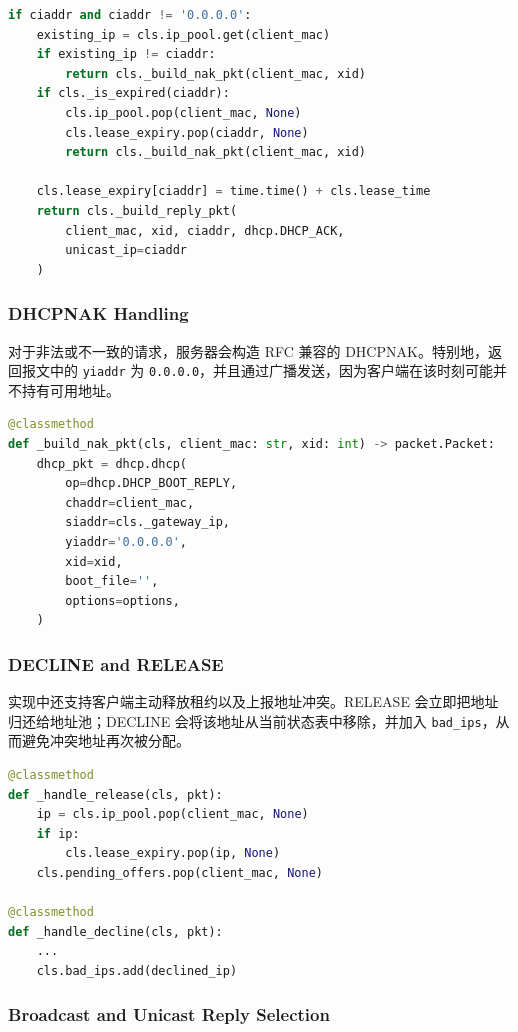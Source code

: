 \documentclass[11pt,a4paper]{ctexart}
\begin{document}
\begin{lstlisting}[language=Python]
if ciaddr and ciaddr != '0.0.0.0':
    existing_ip = cls.ip_pool.get(client_mac)
    if existing_ip != ciaddr:
        return cls._build_nak_pkt(client_mac, xid)
    if cls._is_expired(ciaddr):
        cls.ip_pool.pop(client_mac, None)
        cls.lease_expiry.pop(ciaddr, None)
        return cls._build_nak_pkt(client_mac, xid)

    cls.lease_expiry[ciaddr] = time.time() + cls.lease_time
    return cls._build_reply_pkt(
        client_mac, xid, ciaddr, dhcp.DHCP_ACK,
        unicast_ip=ciaddr
    )
\end{lstlisting}

\subsubsection{DHCPNAK Handling}

对于非法或不一致的请求，服务器会构造 RFC 兼容的 DHCPNAK。特别地，返回报文中的 \texttt{yiaddr} 为 \texttt{0.0.0.0}，并且通过广播发送，因为客户端在该时刻可能并不持有可用地址。

\begin{lstlisting}[language=Python]
@classmethod
def _build_nak_pkt(cls, client_mac: str, xid: int) -> packet.Packet:
    dhcp_pkt = dhcp.dhcp(
        op=dhcp.DHCP_BOOT_REPLY,
        chaddr=client_mac,
        siaddr=cls._gateway_ip,
        yiaddr='0.0.0.0',
        xid=xid,
        boot_file='',
        options=options,
    )
\end{lstlisting}

\subsubsection{DECLINE and RELEASE}

实现中还支持客户端主动释放租约以及上报地址冲突。RELEASE 会立即把地址归还给地址池；DECLINE 会将该地址从当前状态表中移除，并加入 \mbox{\texttt{bad\_ips}}，从而避免冲突地址再次被分配。

\begin{lstlisting}[language=Python]
@classmethod
def _handle_release(cls, pkt):
    ip = cls.ip_pool.pop(client_mac, None)
    if ip:
        cls.lease_expiry.pop(ip, None)
    cls.pending_offers.pop(client_mac, None)

@classmethod
def _handle_decline(cls, pkt):
    ...
    cls.bad_ips.add(declined_ip)
\end{lstlisting}

\subsubsection{Broadcast and Unicast Reply Selection}
\end{document}
